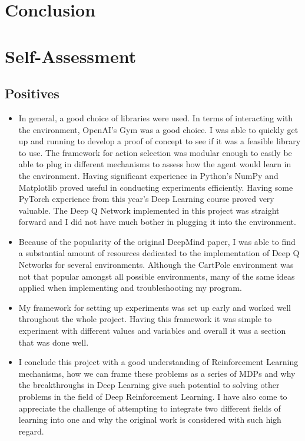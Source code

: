 \documentclass{article}
\begin{document}
\section{Conclusion}


\newpage 

\section{Self-Assessment}

\subsection{Positives}

\begin{itemize}

    \item In general, a good choice of libraries were used. In terms of interacting with the environment, OpenAI's Gym was a good choice. I was able to quickly get up and running to develop a proof of concept to see if it was a feasible library to use. The framework for action selection was modular enough to easily be able to plug in different mechanisms to assess how the agent would learn in the environment. Having significant experience in Python's NumPy and Matplotlib proved useful in conducting experiments efficiently. Having some PyTorch experience from this year's Deep Learning course proved very valuable. The Deep Q Network implemented in this project was straight forward and I did not have much bother in plugging it into the environment. 
    
    \item Because of the popularity of the original DeepMind paper\cite{mnih2013atari}, I was able to find a substantial amount of resources dedicated to the implementation of Deep Q Networks for several environments. Although the CartPole environment was not that popular amongst all possible environments, many of the same ideas\cite{ritakurban} applied when implementing and troubleshooting my program. 
    
    \item My framework for setting up experiments was set up early and worked well throughout the whole project. Having this framework it was simple to experiment with different values and variables and overall it was a section that was done well. 
    
    \item I conclude this project with a good understanding of Reinforcement Learning mechanisms, how we can frame these problems as a series of MDPs and why the breakthroughs in Deep Learning give such potential to solving other problems in the field of Deep Reinforcement Learning. I have also come to appreciate the challenge of attempting to integrate two different fields of learning into one and why the original work\cite{mnih2013atari} is considered with such high regard. 
    
\end{itemize}
\end{document}
